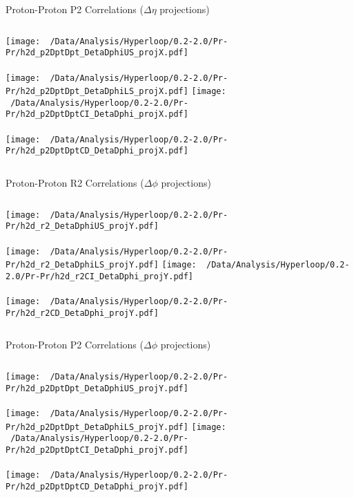 \documentclass{beamer}
\begin{document}
\begin{frame}{Proton-Proton P2 Correlations ($\Delta\eta$ projections)}
	\begin{columns}
		\centering
		\texttt{[image: ~/Data/Analysis/Hyperloop/0.2-2.0/Pr-Pr/h2d\_p2DptDpt\_DetaDphiUS\_projX.pdf]}\\~\\
		\texttt{[image: ~/Data/Analysis/Hyperloop/0.2-2.0/Pr-Pr/h2d\_p2DptDpt\_DetaDphiLS\_projX.pdf]}
		\centering
		\texttt{[image: ~/Data/Analysis/Hyperloop/0.2-2.0/Pr-Pr/h2d\_p2DptDptCI\_DetaDphi\_projX.pdf]}\\~\\
		\texttt{[image: ~/Data/Analysis/Hyperloop/0.2-2.0/Pr-Pr/h2d\_p2DptDptCD\_DetaDphi\_projX.pdf]}
	\end{columns}
\end{frame}
\begin{frame}{Proton-Proton R2 Correlations ($\Delta\phi$ projections)}
	\begin{columns}
		\column{0.5\linewidth}
		\centering
		\texttt{[image: ~/Data/Analysis/Hyperloop/0.2-2.0/Pr-Pr/h2d\_r2\_DetaDphiUS\_projY.pdf]}\\~\\
		\texttt{[image: ~/Data/Analysis/Hyperloop/0.2-2.0/Pr-Pr/h2d\_r2\_DetaDphiLS\_projY.pdf]}
		\column{0.5\linewidth}
		\centering
		\texttt{[image: ~/Data/Analysis/Hyperloop/0.2-2.0/Pr-Pr/h2d\_r2CI\_DetaDphi\_projY.pdf]}\\~\\
		\texttt{[image: ~/Data/Analysis/Hyperloop/0.2-2.0/Pr-Pr/h2d\_r2CD\_DetaDphi\_projY.pdf]}
	\end{columns}
\end{frame}
\begin{frame}{Proton-Proton P2 Correlations ($\Delta\phi$ projections)}
	\begin{columns}
		\centering
		\texttt{[image: ~/Data/Analysis/Hyperloop/0.2-2.0/Pr-Pr/h2d\_p2DptDpt\_DetaDphiUS\_projY.pdf]}\\~\\
		\texttt{[image: ~/Data/Analysis/Hyperloop/0.2-2.0/Pr-Pr/h2d\_p2DptDpt\_DetaDphiLS\_projY.pdf]}
		\centering
		\texttt{[image: ~/Data/Analysis/Hyperloop/0.2-2.0/Pr-Pr/h2d\_p2DptDptCI\_DetaDphi\_projY.pdf]}\\~\\
		\texttt{[image: ~/Data/Analysis/Hyperloop/0.2-2.0/Pr-Pr/h2d\_p2DptDptCD\_DetaDphi\_projY.pdf]}
	\end{columns}
\end{frame}
\end{document}
